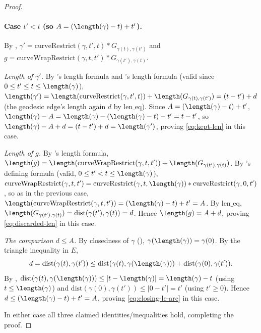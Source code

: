 \begin{proof}
  \paragraph{Case $t'<t$ (so $A=(\length(\gamma)-t)+t'$).} By , $\gamma' =
  \mathrm{curveRestrict}(\gamma,t',t) * G_{\gamma(t),\gamma(t')}$ and $g =
  \mathrm{curveWrapRestrict}(\gamma,t,t') * G_{\gamma(t'),\gamma(t)}$.

  \emph{Length of $\gamma'$.} By 's length formula and
  's length formula (valid since $0\le t'\le t\le\length(\gamma)$),
  $\length(\gamma') = \length(\mathrm{curveRestrict}(\gamma,t',t)) +
  \length(G_{\gamma(t),\gamma(t')}) = (t-t') + d$ (the geodesic edge's length again $d$ by
  $\mathrm{len\_eq}$). Since $A = (\length(\gamma)-t)+t'$, $\length(\gamma)-A =
  \length(\gamma)-(\length(\gamma)-t)-t' = t-t'$, so $\length(\gamma)-A+d = (t-t')+d = \length(\gamma')$,
  proving \eqref{eq:kept-len} in this case.

  \emph{Length of $g$.} By 's length formula, $\length(g) =
  \length(\mathrm{curveWrapRestrict}(\gamma,t,t')) + \length(G_{\gamma(t'),\gamma(t)})$. By
  's defining formula (valid, $0\le t'<t\le\length(\gamma)$),
  $\mathrm{curveWrapRestrict}(\gamma,t,t') = \mathrm{curveRestrict}(\gamma,t,\length(\gamma)) *
  \mathrm{curveRestrict}(\gamma,0,t')$, so as in the previous case,
  $\length(\mathrm{curveWrapRestrict}(\gamma,t,t')) = (\length(\gamma)-t)+t' = A$. By
  $\mathrm{len\_eq}$, $\length(G_{\gamma(t'),\gamma(t)}) = \mathrm{dist}(\gamma(t'),\gamma(t)) = d$.
  Hence $\length(g) = A+d$, proving \eqref{eq:discarded-len} in this case.

  \emph{The comparison $d \le A$.} By closedness of $\gamma$ (),
  $\gamma(\length(\gamma)) = \gamma(0)$. By the triangle inequality in $E$,
  \[
    d = \mathrm{dist}(\gamma(t),\gamma(t')) \le \mathrm{dist}(\gamma(t),\gamma(\length(\gamma)))
    + \mathrm{dist}(\gamma(0),\gamma(t'))
    .
  \]
  By , $\mathrm{dist}(\gamma(t),\gamma(\length(\gamma))) \le
  |t-\length(\gamma)| = \length(\gamma)-t$ (using $t\le\length(\gamma)$) and
  $\mathrm{dist}(\gamma(0),\gamma(t')) \le |0-t'| = t'$ (using $t'\ge0$). Hence $d \le
  (\length(\gamma)-t)+t' = A$, proving \eqref{eq:closing-le-arc} in this case.

  In either case all three claimed identities/inequalities hold, completing the proof.
\end{proof}

